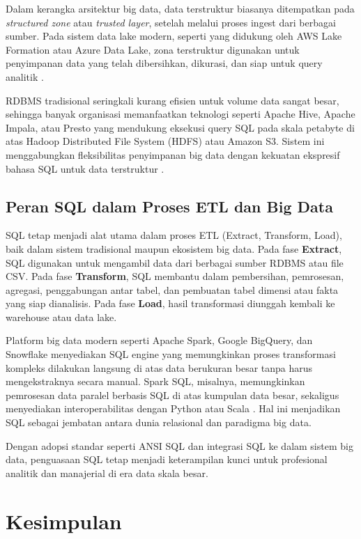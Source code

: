 Dalam kerangka arsitektur big data, data terstruktur biasanya ditempatkan pada \textit{structured zone} atau \textit{trusted layer}, setelah melalui proses ingest dari berbagai sumber. Pada sistem data lake modern, seperti yang didukung oleh AWS Lake Formation atau Azure Data Lake, zona terstruktur digunakan untuk penyimpanan data yang telah dibersihkan, dikurasi, dan siap untuk query analitik \cite{giebler2020structured}.

RDBMS tradisional seringkali kurang efisien untuk volume data sangat besar, sehingga banyak organisasi memanfaatkan teknologi seperti Apache Hive, Apache Impala, atau Presto yang mendukung eksekusi query SQL pada skala petabyte di atas Hadoop Distributed File System (HDFS) atau Amazon S3. Sistem ini menggabungkan fleksibilitas penyimpanan big data dengan kekuatan ekspresif bahasa SQL untuk data terstruktur \cite{armbrust2015spark}.

\subsection{Peran SQL dalam Proses ETL dan Big Data}

SQL tetap menjadi alat utama dalam proses ETL (Extract, Transform, Load), baik dalam sistem tradisional maupun ekosistem big data. Pada fase \textbf{Extract}, SQL digunakan untuk mengambil data dari berbagai sumber RDBMS atau file CSV. Pada fase \textbf{Transform}, SQL membantu dalam pembersihan, pemrosesan, agregasi, penggabungan antar tabel, dan pembuatan tabel dimensi atau fakta yang siap dianalisis. Pada fase \textbf{Load}, hasil transformasi diunggah kembali ke warehouse atau data lake.

Platform big data modern seperti Apache Spark, Google BigQuery, dan Snowflake menyediakan SQL engine yang memungkinkan proses transformasi kompleks dilakukan langsung di atas data berukuran besar tanpa harus mengekstraknya secara manual. Spark SQL, misalnya, memungkinkan pemrosesan data paralel berbasis SQL di atas kumpulan data besar, sekaligus menyediakan interoperabilitas dengan Python atau Scala \cite{zaharia2016spark}. Hal ini menjadikan SQL sebagai jembatan antara dunia relasional dan paradigma big data.

Dengan adopsi standar seperti ANSI SQL dan integrasi SQL ke dalam sistem big data, penguasaan SQL tetap menjadi keterampilan kunci untuk profesional analitik dan manajerial di era data skala besar.


\section{Kesimpulan}

